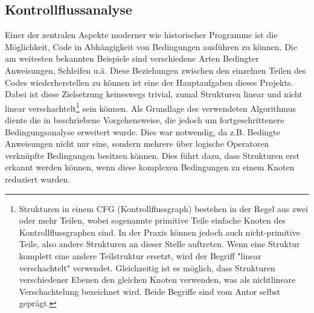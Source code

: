 \documentclass[11pt]{article}
\begin{document}
\subsection{Kontrollflussanalyse} \label{sec:CFA} Einer der zentralen Aspekte moderner wie
historischer Programme ist die Möglichkeit, Code in Abhängigkeit von Bedingungen ausführen zu
können. Die am weitesten bekannten Beispiele sind verschiedene Arten Bedingter Anweisungen, Schleifen
u.ä. Diese Beziehungen zwischen den einzelnen Teilen des Codes wiederherstellen zu können ist eine der
Hauptaufgaben dieses Projekts. Dabei ist diese Zielsetzung keineswegs trivial, zumal Strukturen
linear und nicht linear verschachtelt\footnote{Strukturen in einem CFG (Kontrollflussgraph)
bestehen in der Regel aus zwei oder mehr Teilen, wobei sogenannte primitive Teile einfache Knoten
des Kontrollflussgraphen sind. In der Praxis können jedoch auch nicht-primitive Teile, also andere
Strukturen an dieser Stelle auftreten. Wenn eine Struktur komplett eine andere Teilstruktur ersetzt,
wird der Begriff "linear verschachtelt" verwendet. Gleichzeitig ist es möglich, dass Strukturen
verschiedener Ebenen den gleichen Knoten verwenden, was als nichtlineare Verschachtelung bezeichnet
wird. Beide Begriffe sind vom Autor selbst geprägt.} sein können. Als Grundlage des verwendeten
Algorithmus diente die in \cite{structural_analysis:1} beschriebene Vorgehensweise, die jedoch um
fortgeschrittenere Bedingungsanalyse erweitert wurde. Dies war notwendig, da z.B. Bedingte Anweisungen
nicht nur eine, sondern mehrere über logische Operatoren verknüpfte Bedingungen besitzen können.
Dies führt dazu, dass Strukturen erst erkannt werden können, wenn diese komplexen Bedingungen zu einem
Knoten reduziert wurden.
\end{document}
